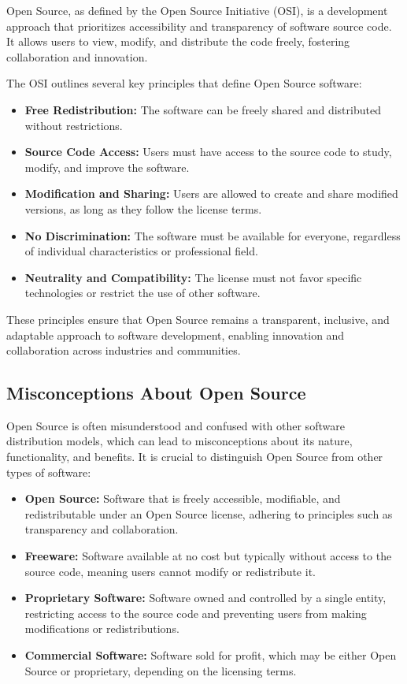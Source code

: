 Open Source, as defined by the Open Source Initiative (OSI), is a development approach that prioritizes accessibility and transparency of software source code. It allows users to view, modify, and distribute the code freely, fostering collaboration and innovation. 

The OSI outlines several key principles that define Open Source software:

\begin{itemize}
    \item \textbf{Free Redistribution:} The software can be freely shared and distributed without restrictions.
    \item \textbf{Source Code Access:} Users must have access to the source code to study, modify, and improve the software.
    \item \textbf{Modification and Sharing:} Users are allowed to create and share modified versions, as long as they follow the license terms.
    \item \textbf{No Discrimination:} The software must be available for everyone, regardless of individual characteristics or professional field.
    \item \textbf{Neutrality and Compatibility:} The license must not favor specific technologies or restrict the use of other software.
\end{itemize}

These principles ensure that Open Source remains a transparent, inclusive, and adaptable approach to software development, enabling innovation and collaboration across industries and communities.

\cite{Open_Source_Initiative_OS_definition}

\subsection{Misconceptions About Open Source}

Open Source is often misunderstood and confused with other software distribution models, which can lead to misconceptions about its nature, functionality, and benefits. 
It is crucial to distinguish Open Source from other types of software:

\begin{itemize}
    \item \textbf{Open Source:} Software that is freely accessible, modifiable, and redistributable under an Open Source license, adhering to principles such as transparency and collaboration.
    \item \textbf{Freeware:} Software available at no cost but typically without access to the source code, meaning users cannot modify or redistribute it.
    \item \textbf{Proprietary Software:} Software owned and controlled by a single entity, restricting access to the source code and preventing users from making modifications or redistributions.
    \item \textbf{Commercial Software:} Software sold for profit, which may be either Open Source or proprietary, depending on the licensing terms.
\end{itemize}

